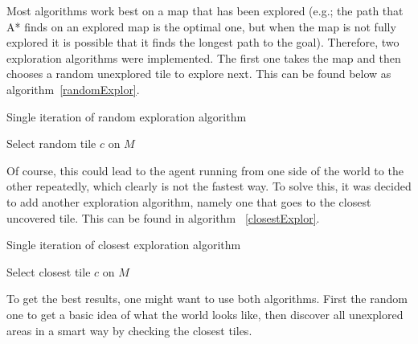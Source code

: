 Most algorithms work best on a map that has been explored (e.g.; the path that A* finds on an explored map is the optimal one, but when the map is not fully explored it is possible that it finds the longest path to the goal). Therefore, two exploration algorithms were implemented. The first one takes the map and then chooses a random unexplored tile to explore next. This can be found below as algorithm~\ref{randomExplor}.

\begin{algorithm}
\label{randomExplor}
  \caption{Single iteration of random exploration algorithm}
    Select random tile $c$ on $M$\;
\end{algorithm}

Of course, this could lead to the agent running from one side of the world to the other repeatedly, which clearly is not the fastest way. To solve this, it was decided to add another exploration algorithm, namely one that goes to the closest uncovered tile. This can be found in algorithm ~\ref{closestExplor}.

\begin{algorithm}
\label{closestExplor}
  \caption{Single iteration of closest exploration algorithm}
    Select closest tile $c$ on $M$\;
\end{algorithm}

To get the best results, one might want to use both algorithms. First the random one to get a basic idea of what the world looks like, then discover all unexplored areas in a smart way by checking the closest tiles.
